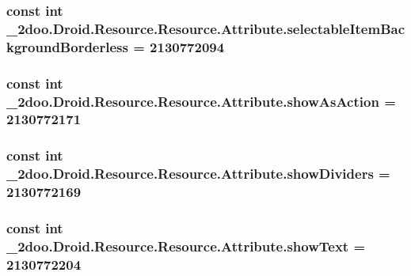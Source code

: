 \hypertarget{class__2doo_1_1_droid_1_1_resource_1_1_attribute_f5f6ebf2109f94e9bb5dbb89bdca2e24}{
\subsubsection[{selectableItemBackgroundBorderless}]{\setlength{\rightskip}{0pt plus 5cm}const int \_\-2doo.Droid.Resource.Resource.Attribute.selectableItemBackgroundBorderless = 2130772094}}
\label{class__2doo_1_1_droid_1_1_resource_1_1_attribute_f5f6ebf2109f94e9bb5dbb89bdca2e24}


\hypertarget{class__2doo_1_1_droid_1_1_resource_1_1_attribute_09e27a27d8ccc11b4a5c936a41ee6c42}{
\subsubsection[{showAsAction}]{\setlength{\rightskip}{0pt plus 5cm}const int \_\-2doo.Droid.Resource.Resource.Attribute.showAsAction = 2130772171}}
\label{class__2doo_1_1_droid_1_1_resource_1_1_attribute_09e27a27d8ccc11b4a5c936a41ee6c42}


\hypertarget{class__2doo_1_1_droid_1_1_resource_1_1_attribute_fbc5f9798afb8db42cd6f3596c0e0d2f}{
\subsubsection[{showDividers}]{\setlength{\rightskip}{0pt plus 5cm}const int \_\-2doo.Droid.Resource.Resource.Attribute.showDividers = 2130772169}}
\label{class__2doo_1_1_droid_1_1_resource_1_1_attribute_fbc5f9798afb8db42cd6f3596c0e0d2f}


\hypertarget{class__2doo_1_1_droid_1_1_resource_1_1_attribute_74c08dce091c393cc7d068b16d300931}{
\subsubsection[{showText}]{\setlength{\rightskip}{0pt plus 5cm}const int \_\-2doo.Droid.Resource.Resource.Attribute.showText = 2130772204}}
\label{class__2doo_1_1_droid_1_1_resource_1_1_attribute_74c08dce091c393cc7d068b16d300931}


